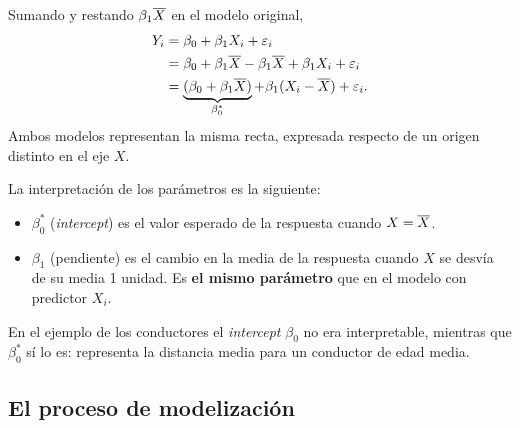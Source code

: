 \begin{demostracion}[Comprobación]
  Sumando y restando $\beta_1\overline{X}$ en el modelo original,
  \begin{align*}
    Y_i &= \beta_0 + \beta_1X_i + \varepsilon_i \\
        &= \beta_0 + \beta_1\overline{X} - \beta_1\overline{X} + \beta_1X_i + \varepsilon_i \\
        &= \underbrace{(\beta_0 + \beta_1\overline{X})}_{\beta_0^*}
          + \beta_1(X_i-\overline{X}) + \varepsilon_i .
  \end{align*}
  Ambos modelos representan la misma recta, expresada respecto de un origen distinto en el
  eje $X$.
\end{demostracion}

La interpretación de los parámetros es la siguiente:
\begin{itemize}
  \item $\beta_0^*$ (\emph{intercept}) es el valor esperado de la respuesta cuando $X=\overline{X}$.
  \item $\beta_1$ (pendiente) es el cambio en la media de la respuesta cuando $X$ se desvía de
    su media 1 unidad. Es \textbf{el mismo parámetro} que en el modelo con predictor $X_i$.
\end{itemize}

\begin{nota}
  En el ejemplo de los conductores el \emph{intercept} $\beta_0$ no era interpretable, mientras que
  $\beta_0^*$ sí lo es: representa la distancia media para un conductor de edad media.
\end{nota}

\subsection{El proceso de modelización}

